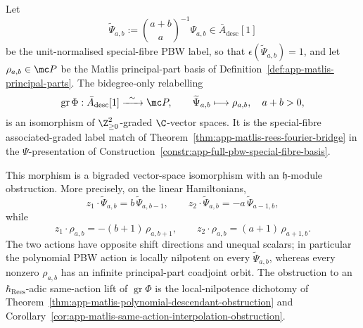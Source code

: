 \begin{prop}
\label{prop:app-full-gr-Phi}
  Let
  \[
    \widetilde\Psi_{a,b}
      :=
    \binom{a+b}{a}^{-1}\Psi_{a,b}
      \in\bar A_{\mathrm{desc}}[1]
  \]
  be the unit-normalised special-fibre PBW label, so that
  \(\epsilon(\widetilde\Psi_{a,b})=1\), and let
  \(\rho_{a,b}\in\mc P\) be the Matlis principal-part basis of
  Definition~\ref{def:app-matlis-principal-parts}.  The bidegree-only
  relabelling
  \[
    \operatorname{gr}\Phi:
    \bar A_{\mathrm{desc}}[1]
      \xrightarrow{\;\;\sim\;\;}
    \mc P,
    \qquad
    \widetilde\Psi_{a,b}\longmapsto\rho_{a,b},\quad a+b>0,
  \]
  is an isomorphism of \(\Z_{\geq0}^2\)-graded
  \(\C\)-vector spaces.  It is the special-fibre associated-graded
  label match of
  Theorem~\ref{thm:app-matlis-rees-fourier-bridge} in the
  \(\Psi\)-presentation of
  Construction~\ref{constr:app-full-pbw-special-fibre-basis}.

  This morphism is a bigraded vector-space isomorphism with an
  \(\mathfrak h\)-module obstruction. More precisely, on the linear Hamiltonians,
  \[
    z_1\cdot\widetilde\Psi_{a,b}
      =b\,\widetilde\Psi_{a,b-1},
      \qquad
    z_2\cdot\widetilde\Psi_{a,b}
      =-a\,\widetilde\Psi_{a-1,b},
  \]
  while
  \[
    z_1\cdot\rho_{a,b}
      =-(b+1)\,\rho_{a,b+1},
      \qquad
    z_2\cdot\rho_{a,b}
      =(a+1)\,\rho_{a+1,b}.
  \]
  The two actions have opposite shift directions and unequal scalars; in
  particular the polynomial PBW action is locally nilpotent on every
  \(\widetilde\Psi_{a,b}\), whereas every nonzero \(\rho_{a,b}\) has an
  infinite principal-part coadjoint orbit.  The
  obstruction to an \(\hbar_{\mathrm{Rees}}\)-adic same-action lift of
  \(\operatorname{gr}\Phi\) is the local-nilpotence dichotomy of
  Theorem~\ref{thm:app-matlis-polynomial-descendant-obstruction} and
  Corollary~\ref{cor:app-matlis-same-action-interpolation-obstruction}.
\end{prop}

